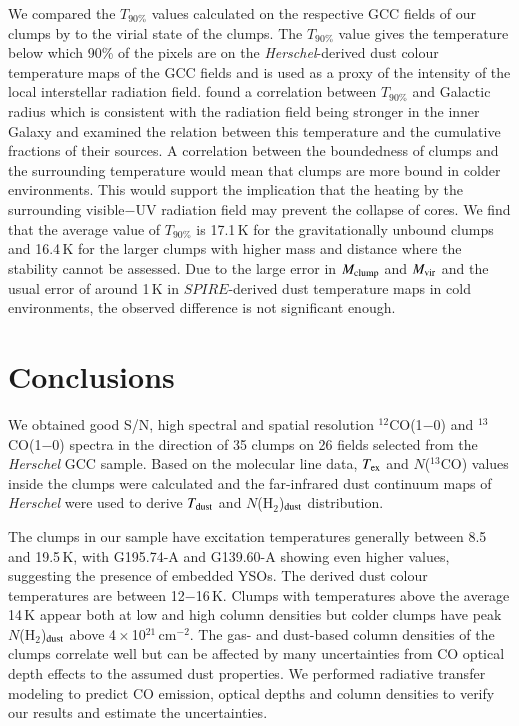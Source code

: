 \documentclass[printer]{aa}
\begin{document}
We compared the $T_{90\%}$ values calculated on the respective GCC fields of our clumps by \citet{montillaud2015} to the virial state of the clumps. The $T_{90\%}$ value gives the temperature below which 90\% of the pixels are on the \textit{Herschel}-derived dust colour temperature maps of the GCC fields and is used as a proxy of the intensity of the local interstellar radiation field. \citet{montillaud2015} found a correlation between $T_{90\%}$ and Galactic radius which is consistent with the radiation field being stronger in the inner Galaxy and examined the relation between this temperature and the cumulative fractions of their sources. A correlation between the boundedness of clumps and the surrounding temperature would mean that clumps are more bound in colder environments. This would support the implication that the heating by the surrounding visible$-$UV radiation field may prevent the collapse of cores. We find that the average value of $T_{90\%}$ is 17.1\,K for the gravitationally unbound clumps and 16.4\,K for the larger clumps with higher mass and distance where the stability cannot be assessed. Due to the large error in $M_{\rm clump}$ and $M_{\rm vir}$ and the usual error of around 1\,K in $SPIRE$-derived dust temperature maps in cold environments, the observed difference is not significant enough.

\section{Conclusions}

We obtained good S/N, high spectral and spatial resolution $^{12}$CO(1$-$0) and $^{13}$CO(1$-$0) spectra in the direction of 35 clumps on 26 fields selected from the \textit{Herschel} GCC sample. Based on the molecular line data, $T_{\rm ex}$ and $N$($^{13}$CO) values inside the clumps were calculated and the far-infrared dust continuum maps of \textit{Herschel} were used to derive $T_{\rm dust}$ and $N$(H$_2$)$_{\rm dust}$ distribution. 

The clumps in our sample have excitation temperatures generally between 8.5 and 19.5\,K, with G195.74-A and G139.60-A showing even higher values, suggesting the presence of embedded YSOs. The derived dust colour temperatures are between 12$-$16\,K. Clumps with temperatures above the average 14\,K appear both at low and high column densities but colder clumps have peak $N$(H$_2$)$_{\rm dust}$ above 4\,$\times$\,10$^{21}$\,cm$^{-2}$. The gas- and dust-based column densities of the clumps correlate well but can be affected by many uncertainties from CO optical depth effects to the assumed dust properties. We performed radiative transfer modeling to predict CO emission, optical depths and column densities to verify our results and estimate the uncertainties.
\end{document}

